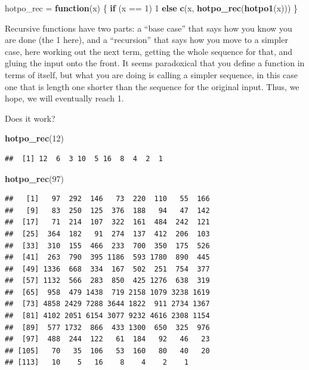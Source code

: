 \documentclass[]{tufte-book}
\newenvironment{Shaded}{}{}
\newcommand{\ControlFlowTok}[1]{\textcolor[rgb]{0.00,0.44,0.13}{\textbf{#1}}}
\newcommand{\DecValTok}[1]{\textcolor[rgb]{0.25,0.63,0.44}{#1}}
\newcommand{\KeywordTok}[1]{\textcolor[rgb]{0.00,0.44,0.13}{\textbf{#1}}}
\newcommand{\NormalTok}[1]{#1}
\newcommand{\OperatorTok}[1]{\textcolor[rgb]{0.40,0.40,0.40}{#1}}
\newcommand{\StringTok}[1]{\textcolor[rgb]{0.25,0.44,0.63}{#1}}
\theoremstyle{definition}
\theoremstyle{definition}
\theoremstyle{definition}
\theoremstyle{remark}
\begin{document}
\begin{Shaded}
\begin{Highlighting}[]
\NormalTok{hotpo_rec =}\StringTok{ }\ControlFlowTok{function}\NormalTok{(x) \{}
    \ControlFlowTok{if}\NormalTok{ (x }\OperatorTok{==}\StringTok{ }\DecValTok{1}\NormalTok{) }
        \DecValTok{1} \ControlFlowTok{else} \KeywordTok{c}\NormalTok{(x, }\KeywordTok{hotpo_rec}\NormalTok{(}\KeywordTok{hotpo1}\NormalTok{(x)))}
\NormalTok{\}}
\end{Highlighting}
\end{Shaded}

Recursive functions have two parts: a ``base case'' that says how you
know you are done (the 1 here), and a ``recursion'' that says how you
move to a simpler case, here working out the next term, getting the
whole sequence for that, and gluing the input onto the front. It seems
paradoxical that you define a function in terms of itself, but what you
are doing is calling a simpler sequence, in this case one that is length
one shorter than the sequence for the original input. Thus, we hope,
we will eventually reach 1.

Does it work?

\begin{Shaded}
\begin{Highlighting}[]
\KeywordTok{hotpo_rec}\NormalTok{(}\DecValTok{12}\NormalTok{)}
\end{Highlighting}
\end{Shaded}

\begin{verbatim}
##  [1] 12  6  3 10  5 16  8  4  2  1
\end{verbatim}

\begin{Shaded}
\begin{Highlighting}[]
\KeywordTok{hotpo_rec}\NormalTok{(}\DecValTok{97}\NormalTok{)}
\end{Highlighting}
\end{Shaded}

\begin{verbatim}
##   [1]   97  292  146   73  220  110   55  166
##   [9]   83  250  125  376  188   94   47  142
##  [17]   71  214  107  322  161  484  242  121
##  [25]  364  182   91  274  137  412  206  103
##  [33]  310  155  466  233  700  350  175  526
##  [41]  263  790  395 1186  593 1780  890  445
##  [49] 1336  668  334  167  502  251  754  377
##  [57] 1132  566  283  850  425 1276  638  319
##  [65]  958  479 1438  719 2158 1079 3238 1619
##  [73] 4858 2429 7288 3644 1822  911 2734 1367
##  [81] 4102 2051 6154 3077 9232 4616 2308 1154
##  [89]  577 1732  866  433 1300  650  325  976
##  [97]  488  244  122   61  184   92   46   23
## [105]   70   35  106   53  160   80   40   20
## [113]   10    5   16    8    4    2    1
\end{verbatim}
\end{document}
